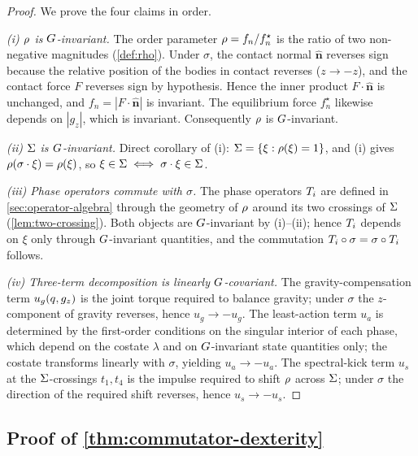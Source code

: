 \begin{proof}
We prove the four claims in order.

\emph{(i) $\rho$ is $G$-invariant.} The order
parameter $\rho = f_{n}/f_{n}^{\star}$ is the ratio of two
non-negative magnitudes (\cref{def:rho}). Under $\sigma$, the
contact normal $\hat{\mathbf n}$ reverses sign because the
relative position of the bodies in contact reverses ($z \to -z$),
and the contact force $F$ reverses sign by hypothesis. Hence
the inner product $F \cdot \hat{\mathbf n}$ is unchanged, and
$f_{n} = |F \cdot \hat{\mathbf n}|$ is invariant. The
equilibrium force $f_{n}^{\star}$ likewise depends on $|g_{z}|$,
which is invariant. Consequently $\rho$ is
$G$-invariant.

\emph{(ii) $\Sigma$ is $G$-invariant.} Direct corollary
of (i): $\Sigma = \{\xi : \rho(\xi) = 1\}$, and (i) gives
$\rho(\sigma \cdot \xi) = \rho(\xi)$, so
$\xi \in \Sigma \iff \sigma \cdot \xi \in \Sigma$.

\emph{(iii) Phase operators commute with $\sigma$.} The phase
operators $T_{i}$ are defined in
\cref{sec:operator-algebra} through the geometry of $\rho$
around its two crossings of $\Sigma$ (\cref{lem:two-crossing}).
Both objects are $G$-invariant by (i)--(ii); hence
$T_{i}$ depends on $\xi$ only through
$G$-invariant quantities, and the commutation
$T_{i} \circ \sigma = \sigma \circ T_{i}$ follows.

\emph{(iv) Three-term decomposition is linearly
$G$-covariant.} The gravity-compensation term
$u_{g}(q, g_{z})$ is the joint torque required to balance
gravity; under $\sigma$ the $z$-component of gravity reverses,
hence $u_{g} \to -u_{g}$. The least-action term $u_{a}$ is
determined by the first-order conditions on the singular interior
of each phase, which depend on the costate $\lambda$ and on
$G$-invariant state quantities only; the costate
transforms linearly with $\sigma$, yielding $u_{a} \to -u_{a}$.
The spectral-kick term $u_{s}$ at the $\Sigma$-crossings
$t_{1}, t_{4}$ is the impulse required to shift $\rho$
across $\Sigma$; under $\sigma$ the direction of the required
shift reverses, hence $u_{s} \to -u_{s}$.
\end{proof}

\subsection{Proof of \cref{thm:commutator-dexterity}}
\label{app:proof:commutator-dexterity}

